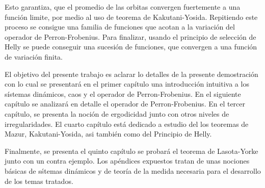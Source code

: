 Esto garantiza, que el promedio de las orbitas convergen fuertemente a una funci\'on limite, por medio  al uso de teorema
de Kakutani-Yosida.  Repitiendo este proceso se consigue una familia de funciones que acotan a la variaci\'on del operador
de Perron-Frobenius. Para finalizar, usando el principio de selecci\'on de Helly se puede conseguir una sucesi\'on de funciones,
que convergen a una funci\'on de variaci\'on finita.

El objetivo del presente trabajo es aclarar lo detalles de la  presente demostraci\'on con lo cual se presentar\'a en el primer
cap\'itulo una introducci\'on intuitiva a los s\'istemas din\'amicos, caos y el operador de Perron-Frobenius. En el siguiente
cap\'itulo se analizar\'a en detalle el operador de Perron-Frobenius. En el tercer cap\'itulo,
se presenta la noci\'on de ergodicidad junto con otros niveles de irregularidades. El cuarto cap\'itulo est\'a dedicado a estudio
del los teoremas de Mazur, Kakutani-Yosida, asi tambi\'en  como del Principio de Helly.

Finalmente, se presenta el quinto cap\'itulo se probar\'a el teorema de Lasota-Yorke junto con un contra ejemplo. Los ap\'endices expuestos tratan
de unas nociones b\'asicas de s\'stemas din\'amicos y de teor\'ia de la medida necesaria para el desarrollo  de los temas tratados.

